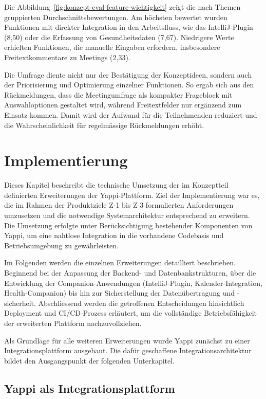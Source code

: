 \documentclass[12pt,a4paper]{report}
\begin{document}
Die Abbildung~\ref{fig:konzept-eval-feature-wichtigkeit} zeigt die nach Themen gruppierten Durchschnittsbewertungen.
Am höchsten bewertet wurden Funktionen mit direkter Integration in den Arbeitsfluss, wie das IntelliJ-Plugin (8,50)
oder die Erfassung von Gesundheitsdaten (7,67).
Niedrigere Werte erhielten Funktionen, die manuelle Eingaben erfordern, insbesondere Freitextkommentare zu Meetings (2,33).

Die Umfrage diente nicht nur der Bestätigung der Konzeptideen, sondern auch der Priorisierung und Optimierung einzelner Funktionen.
So ergab sich aus den Rückmeldungen, dass die Meetingumfrage als kompakter Frageblock mit Auswahloptionen gestaltet wird,
während Freitextfelder nur ergänzend zum Einsatz kommen.
Damit wird der Aufwand für die Teilnehmenden reduziert und die Wahrscheinlichkeit für regelmässige Rückmeldungen erhöht.

\chapter{Implementierung}

Dieses Kapitel beschreibt die technische Umsetzung der im Konzeptteil definierten Erweiterungen der Yappi-Plattform. Ziel der 
Implementierung war es, die im Rahmen der Produktziele Z-1 bis Z-3 formulierten Anforderungen umzusetzen und die notwendige
Systemarchitektur entsprechend zu erweitern. Die Umsetzung erfolgte unter Berücksichtigung bestehender Komponenten von Yappi, um
eine nahtlose Integration in die vorhandene Codebasis und Betriebsumgebung zu gewährleisten.

Im Folgenden werden die einzelnen Erweiterungen detailliert beschrieben. Beginnend bei der Anpassung der Backend- und
Datenbankstrukturen, über die Entwicklung der Companion-Anwendungen (IntelliJ-Plugin, Kalender-Integration, Health-Companion) bis
hin zur Sicherstellung der Datenübertragung und -sicherheit. Abschliessend werden die getroffenen Entscheidungen hinsichtlich
Deployment und CI/CD-Prozess erläutert, um die vollständige Betriebsfähigkeit der erweiterten Plattform nachzuvollziehen.

Als Grundlage für alle weiteren Erweiterungen wurde Yappi zunächst zu einer Integrationsplattform ausgebaut. Die dafür geschaffene
Integrationsarchitektur bildet den Ausgangspunkt der folgenden Unterkapitel.

\section{Yappi als Integrationsplattform}
\end{document}
